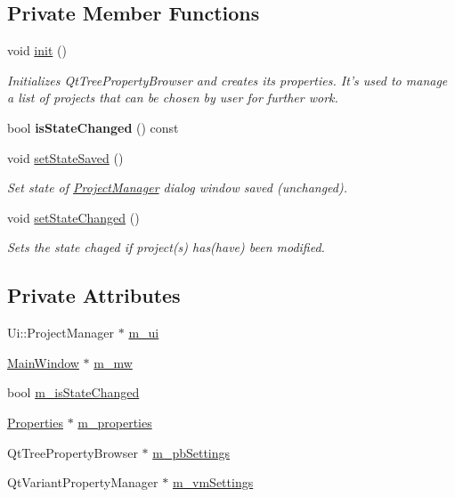 \subsection*{Private Member Functions}
\begin{DoxyCompactItemize}
\item 
void \hyperlink{classProjectManager_afdb622867c005d726057a288fcf56d33}{init} ()
\begin{DoxyCompactList}\small\item\em Initializes Qt\-Tree\-Property\-Browser and creates its properties. It's used to manage a list of projects that can be chosen by user for further work. \end{DoxyCompactList}\item 
\hypertarget{classProjectManager_ad397c063f9164728884beaf221ce03b0}{bool {\bfseries is\-State\-Changed} () const }\label{classProjectManager_ad397c063f9164728884beaf221ce03b0}

\item 
void \hyperlink{classProjectManager_a89c55c9616362e13ef4fd81de2a2389b}{set\-State\-Saved} ()
\begin{DoxyCompactList}\small\item\em Set state of \hyperlink{classProjectManager}{Project\-Manager} dialog window saved (unchanged). \end{DoxyCompactList}\item 
void \hyperlink{classProjectManager_ac178fe4a0ff88ce4b860fa92373f6e23}{set\-State\-Changed} ()
\begin{DoxyCompactList}\small\item\em Sets the state chaged if project(s) has(have) been modified. \end{DoxyCompactList}\end{DoxyCompactItemize}
\subsection*{Private Attributes}
\begin{DoxyCompactItemize}
\item 
Ui\-::\-Project\-Manager $\ast$ \hyperlink{classProjectManager_a522b0621f0ca1978d0cef23fc553fd5e}{m\-\_\-ui}
\item 
\hyperlink{classMainWindow}{Main\-Window} $\ast$ \hyperlink{classProjectManager_a854e94a40ac35e0dc3fe45ef12ff855a}{m\-\_\-mw}
\item 
bool \hyperlink{classProjectManager_aa7cad9fe90b6a9bbaa0ae6d727d12e7c}{m\-\_\-is\-State\-Changed}
\item 
\hyperlink{classProperties}{Properties} $\ast$ \hyperlink{classProjectManager_afa1e791a680f491f89aa215a5198f06a}{m\-\_\-properties}
\item 
Qt\-Tree\-Property\-Browser $\ast$ \hyperlink{classProjectManager_a9c23c2284358dd111bc1b29f6ca6f611}{m\-\_\-pb\-Settings}
\item 
Qt\-Variant\-Property\-Manager $\ast$ \hyperlink{classProjectManager_a713a455e7c92cc5875d590c6d4bb0bf0}{m\-\_\-vm\-Settings}
\end{DoxyCompactItemize}


